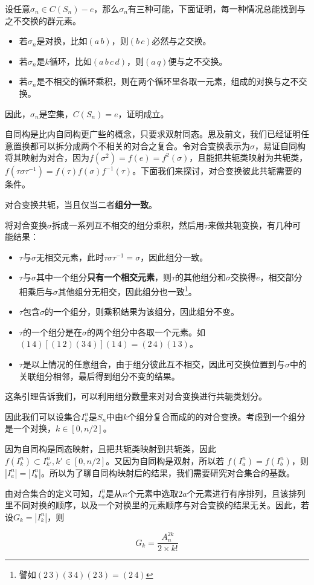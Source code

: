 设任意$\sigma_n\in C(S_n)-e$，那么$\sigma_n$有三种可能，下面证明，每一种情况总能找到与之不交换的群元素。

\begin{itemize}
\item 若$\sigma_n$是对换，比如$(a\,b)$，则$(b\,c)$必然与之交换。
\item 若$\sigma_n$是$k$循环，比如$(a\,b\,c\,d)$，则$(a\,q)$便与之不交换。
\item 若$\sigma_n$是不相交的循环乘积，则在两个循环里各取一元素，组成的对换与之不交换。
\end{itemize}
因此，$\sigma_n$是空集，$C(S_n)=e$，证明成立。

自同构是比内自同构更广些的概念，只要求双射同态。思及前文，我们已经证明任意置换都可以拆分成两个不相关的对合之复合。令对合变换表示为$\sigma$，易证自同构将其映射为对合，因为$f(\sigma^2)=f(e)=f^2(\sigma)$，且能把共轭类映射为共轭类，$f(\tau\sigma\tau^{-1})=f(\tau)f(\sigma)f^{-1}(\tau)$。下面我们来探讨，对合变换彼此共轭需要的条件。


\begin{lemma}{}
对合变换共轭，当且仅当二者\textbf{组分一致}。
\end{lemma}
将对合变换$\sigma$拆成一系列互不相交的组分乘积，然后用$\tau$来做共轭变换，有几种可能结果：
\begin{itemize}
\item $\tau$与$\sigma$无相交元素，此时$\tau\sigma\tau^{-1}=\sigma$，因此组分一致。
\item $\tau$与$\sigma$其中一个组分\textbf{只有一个相交元素}，则$\tau$的其他组分和$\sigma$交换得$e$，相交部分相乘后与$\sigma$其他组分无相交，因此组分也一致\footnote{譬如$(2\,3)(3\,4)(2\,3)=(2\,4)$}。
\item $\tau$包含$\sigma$的一个组分，则乘积结果为该组分，因此组分不变。
\item $\tau$的一个组分是在$\sigma$的两个组分中各取一个元素。如$(1\,4)[(1\,2)(3\,4)](1\,4)=(2\,4)(1\,3)$。
\item $\tau$是以上情况的任意组合，由于组分彼此互不相交，因此可交换位置到与$\sigma$中的关联组分相邻，最后得到组分不变的结果。
\end{itemize}

这条引理告诉我们，可以利用组分数量来对对合变换进行共轭类划分。

因此我们可以设集合$I_k^n$是$S_n$中由$k$个组分复合而成的的对合变换。考虑到一个组分是一个对换，$k\in[0,n/2]$。

因为自同构是同态映射，且把共轭类映射到共轭类，因此$f(I_k^n)\subset I_{k'}^n,k'\in [0,n/2]$。又因为自同构是双射，所以若 $f(I_a^n)=f(I_b^n)$，则$|I_a^n|=|I_b^n|$。所以为了聊自同构映射后的结果，我们需要研究对合集合的基数。

由对合集合的定义可知，$I_a^n$是从$n$个元素中选取$2a$个元素进行有序排列，且该排列里不同对换的顺序，以及一个对换里的元素顺序与对合变换的结果无关。因此，若设$G_k=|I_k^n|$，则

\begin{equation}
G_k=\frac{A_{n}^{2k}}{2\times k!}
\end{equation}